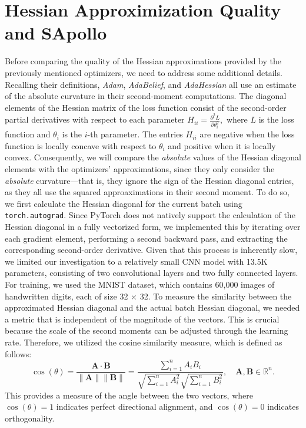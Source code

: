 \section{Hessian Approximization Quality and SApollo}
Before comparing the quality of the Hessian approximations provided by the previously mentioned optimizers,
 we need to address some additional details.
Recalling their definitions, \emph{Adam}, \emph{AdaBelief}, and \emph{AdaHessian} all use an estimate of the
absolute curvature in their second-moment computations.
The diagonal elements of the Hessian matrix of the loss function consist of the second-order partial derivatives with respect to each parameter $H_{ii} = \frac{\partial^2 L}{\partial \theta_i^2},$
where \( L \) is the loss function and \( \theta_i \) is the \( i \)-th parameter.
The entries \( H_{ii} \) are negative when the loss function is locally concave with respect to \( \theta_i \) and positive when it is locally convex.
Consequently, we will compare the \emph{absolute} values of the Hessian diagonal elements with the optimizers' approximations,
 since they only consider the \emph{absolute} curvature—that is, they ignore the sign of the Hessian diagonal entries, 
 as they all use the squared approaximations in their second moment.
To do so, we first calculate the Hessian diagonal for the current batch using \texttt{torch.autograd}.
Since PyTorch does not natively support the calculation of the Hessian diagonal in a fully vectorized form,
we implemented this by iterating over each gradient element, performing a second backward pass, and extracting the corresponding second-order derivative.
Given that this process is inherently slow, we limited our investigation to a relatively small CNN model with 13.5K parameters, consisting of two convolutional layers and two fully connected layers.
For training, we used the MNIST dataset, which contains 60,000 images of handwritten digits, each of size 32 $\times$ 32.
To measure the similarity between the approximated Hessian diagonal and the actual batch Hessian diagonal, we needed a metric that is independent of the magnitude of the vectors.
This is crucial because the scale of the second moments can be adjusted through the learning rate.
Therefore, we utilized the cosine similarity measure, which is defined as follows:
\[
\cos(\theta) = \frac{\mathbf{A} \cdot \mathbf{B}}{\|\mathbf{A}\| \|\mathbf{B}\|} = \frac{\sum_{i=1}^{n} A_i B_i}{\sqrt{\sum_{i=1}^{n} A_i^2} \sqrt{\sum_{i=1}^{n} B_i^2}}, \quad \mathbf{A}, \mathbf{B} \in \mathbb{R}^n.
\]
This provides a measure of the angle between the two vectors, where \( \cos(\theta) = 1 \) indicates perfect directional alignment, and \( \cos(\theta) = 0 \) indicates orthogonality.
